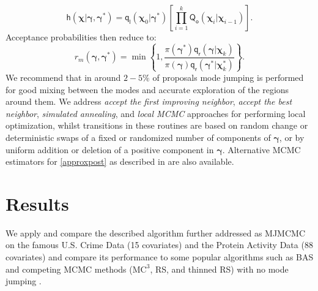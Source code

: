 \documentclass[a0,portrait]{a0poster}
\begin{document}
\begin{multicols}{2}
\begin{equation}
\mathsf{h}(\boldsymbol{\chi}|\boldsymbol{\gamma},\boldsymbol{\gamma}^*) = \mathsf{q}_\mathsf{l}(\boldsymbol{\chi}_{0}|\boldsymbol{\gamma}^*)\left[\prod_{i = 1}^{k}\mathsf{Q_\mathsf{o}}\left(\boldsymbol{\chi}_{i}|\boldsymbol{\chi}_{{i-1}}\right)\right].\label{sah1}
\end{equation}
Acceptance probabilities then reduce to:
\begin{equation}
r_m(\boldsymbol{\gamma},\boldsymbol{\gamma}^*) = \min\left\{1,\frac{\pi(\boldsymbol{\gamma}^*)\mathsf{q}_\mathsf{r}(\boldsymbol{\gamma}|\boldsymbol{\chi}_{k})}{\pi(\boldsymbol{\gamma})\mathsf{q}_\mathsf{r}(\boldsymbol{\gamma}^*|\boldsymbol{\chi}^*_{k})}\right\}\label{locmcmcgen}.
\end{equation}
We recommend that in around $2-5\%$ of proposals mode jumping is performed for good mixing between the modes and accurate exploration of the regions around them. We address \textit{accept the first improving neighbor},  \textit{accept the best neighbor}, \textit{simulated annealing}, and \textit{local MCMC} approaches for performing local optimization, whilst transitions in these routines are based on random change or deterministic swaps of a fixed or randomized number of components of $\boldsymbol{\gamma}$, or by uniform addition or deletion of a positive component in $\boldsymbol{\gamma}$. Alternative MCMC estimators for \eqref{approxpost} as described in \cite{Clyde:Ghosh:Littman:2010, Hubin2016} are also available.
\section*{Results}
We apply and compare the described algorithm further addressed as MJMCMC on the famous U.S. Crime Data (15 covariates) and the Protein Activity Data (88 covariates) and compare its performance to some popular algorithms such as  BAS and competing MCMC methods ($\text{MC}^3$, RS, and thinned RS) with no mode jumping \cite{Clyde:Ghosh:Littman:2010, Hubin2016}.
\color{teal} %

\end{multicols}
\end{document}

